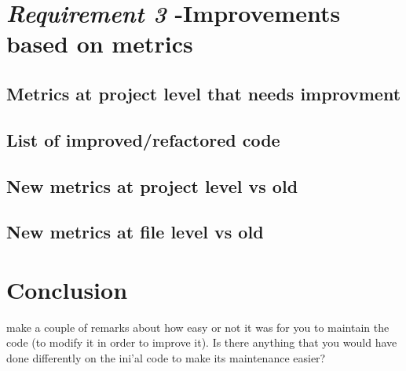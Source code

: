 \documentclass{article}
\begin{document}
\section{\textit{Requirement 3} -Improvements based on metrics}

\subsection{Metrics at project level that needs improvment}

\subsection{List of improved/refactored code}

\subsection{New metrics at project level vs old}

\subsection{New metrics at file level vs old}

\section{Conclusion}
make a couple of remarks about how easy or not it was for you to maintain the code
(to modify it in order to improve it). Is there anything that you would have done differently on
the ini'al code to make its maintenance easier?
\end{document}
